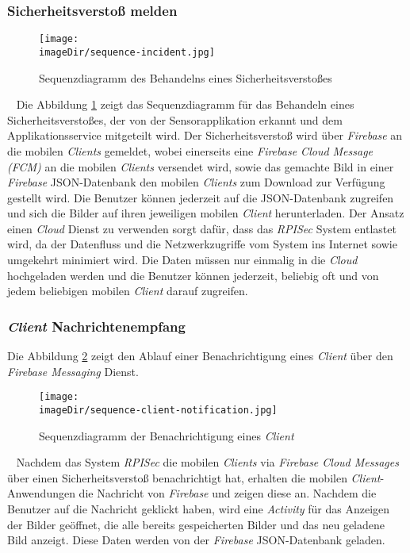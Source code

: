 \subsubsection{Sicherheitsverstoß melden}
\begin{figure}[h]
	\centering
	\texttt{[image: \\imageDir/sequence-incident.jpg]}
	\caption{Sequenzdiagramm des Behandelns eines Sicherheitsverstoßes}
	\label{fig:image-sequence-incident}
\end{figure}
\ \newline
Die Abbildung \ref{fig:image-sequence-incident} zeigt das Sequenzdiagramm für das Behandeln eines Sicherheitsverstoßes, der von der Sensorapplikation erkannt und dem Applikationsservice mitgeteilt wird. Der Sicherheitsverstoß wird über \emph{Firebase} an die mobilen \emph{Clients} gemeldet, wobei einerseits eine \emph{Firebase Cloud Message (FCM)} an die mobilen \emph{Clients} versendet wird, sowie das gemachte Bild in einer \emph{Firebase} JSON-Datenbank den mobilen \emph{Clients} zum Download zur Verfügung gestellt wird. Die Benutzer können jederzeit auf die JSON-Datenbank zugreifen und sich die Bilder auf ihren jeweiligen mobilen \emph{Client} herunterladen. 
\newline
\newline
Der Ansatz einen \emph{Cloud} Dienst zu verwenden sorgt dafür, dass das \emph{RPISec} System entlastet wird, da der Datenfluss und die Netzwerkzugriffe vom System ins Internet sowie umgekehrt minimiert wird. Die Daten müssen nur einmalig in die \emph{Cloud} hochgeladen werden und die Benutzer können jederzeit, beliebig oft und von jedem beliebigen mobilen \emph{Client} darauf zugreifen.
\newpage
 
\subsubsection{\emph{Client} Nachrichtenempfang}
Die Abbildung \ref{fig:image-sequence-client-notification} zeigt den Ablauf einer  Benachrichtigung eines \emph{Client} über den \emph{Firebase Messaging} Dienst.
\begin{figure}[h]
	\centering
	\texttt{[image: \\imageDir/sequence-client-notification.jpg]}
	\caption{Sequenzdiagramm der Benachrichtigung eines \emph{Client}}
	\label{fig:image-sequence-client-notification}
\end{figure}
\ \newline
Nachdem das System \emph{RPISec} die mobilen \emph{Clients} via \emph{Firebase Cloud Messages} über einen Sicherheitsverstoß benachrichtigt hat, erhalten die mobilen \emph{Client}-Anwendungen die Nachricht von \emph{Firebase} und zeigen diese an. Nachdem die Benutzer auf die Nachricht geklickt haben, wird eine \emph{Activity} für das Anzeigen der Bilder geöffnet, die alle bereits gespeicherten Bilder und das neu geladene Bild anzeigt. Diese Daten werden von der \emph{Firebase} JSON-Datenbank geladen. 